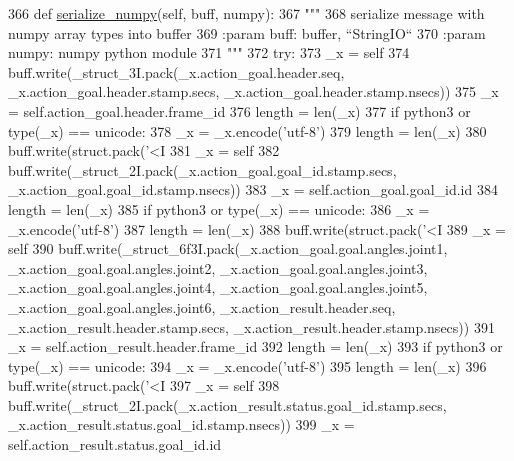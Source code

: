 \begin{DoxyCode}
366   \textcolor{keyword}{def }\hyperlink{classjaco__msgs_1_1msg_1_1__ArmJointAnglesAction_1_1ArmJointAnglesAction_a2fe71a4e99d4ac3d0c43569e043f462e}{serialize\_numpy}(self, buff, numpy):
367     \textcolor{stringliteral}{"""}
368 \textcolor{stringliteral}{    serialize message with numpy array types into buffer}
369 \textcolor{stringliteral}{    :param buff: buffer, ``StringIO``}
370 \textcolor{stringliteral}{    :param numpy: numpy python module}
371 \textcolor{stringliteral}{    """}
372     \textcolor{keywordflow}{try}:
373       \_x = self
374       buff.write(\_struct\_3I.pack(\_x.action\_goal.header.seq, \_x.action\_goal.header.stamp.secs, 
      \_x.action\_goal.header.stamp.nsecs))
375       \_x = self.action\_goal.header.frame\_id
376       length = len(\_x)
377       \textcolor{keywordflow}{if} python3 \textcolor{keywordflow}{or} type(\_x) == unicode:
378         \_x = \_x.encode(\textcolor{stringliteral}{'utf-8'})
379         length = len(\_x)
380       buff.write(struct.pack(\textcolor{stringliteral}{'<I%
381       \_x = self
382       buff.write(\_struct\_2I.pack(\_x.action\_goal.goal\_id.stamp.secs, \_x.action\_goal.goal\_id.stamp.nsecs))
383       \_x = self.action\_goal.goal\_id.id
384       length = len(\_x)
385       \textcolor{keywordflow}{if} python3 \textcolor{keywordflow}{or} type(\_x) == unicode:
386         \_x = \_x.encode(\textcolor{stringliteral}{'utf-8'})
387         length = len(\_x)
388       buff.write(struct.pack(\textcolor{stringliteral}{'<I%
389       \_x = self
390       buff.write(\_struct\_6f3I.pack(\_x.action\_goal.goal.angles.joint1, \_x.action\_goal.goal.angles.joint2, 
      \_x.action\_goal.goal.angles.joint3, \_x.action\_goal.goal.angles.joint4, \_x.action\_goal.goal.angles.joint5, 
      \_x.action\_goal.goal.angles.joint6, \_x.action\_result.header.seq, \_x.action\_result.header.stamp.secs, 
      \_x.action\_result.header.stamp.nsecs))
391       \_x = self.action\_result.header.frame\_id
392       length = len(\_x)
393       \textcolor{keywordflow}{if} python3 \textcolor{keywordflow}{or} type(\_x) == unicode:
394         \_x = \_x.encode(\textcolor{stringliteral}{'utf-8'})
395         length = len(\_x)
396       buff.write(struct.pack(\textcolor{stringliteral}{'<I%
397       \_x = self
398       buff.write(\_struct\_2I.pack(\_x.action\_result.status.goal\_id.stamp.secs, 
      \_x.action\_result.status.goal\_id.stamp.nsecs))
399       \_x = self.action\_result.status.goal\_id.id
}}}
\end{DoxyCode}
